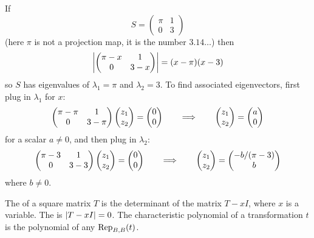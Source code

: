 \begin{example} \label{ex:AnotherCharPoly}
If
\begin{equation*}
  S=
  \begin{pmatrix}
    \pi      &1      \\
    0        &3
  \end{pmatrix}
\end{equation*}
(here \( \pi \) is not a projection map, it is the number
\( 3.14\ldots \)) then
\begin{equation*}
  \deter{
    \begin{pmatrix}
      \pi-x &1         \\
      0     &3-x
    \end{pmatrix} }
  =
  (x-\pi)(x-3)
\end{equation*}
so \( S \) has eigenvalues of \( \lambda_1=\pi \) and \( \lambda_2=3 \).
To find associated eigenvectors, first plug in $\lambda_1$ for $x$:
\begin{equation*}
  \begin{pmatrix}
    \pi-\pi     &1         \\
    0           &3-\pi
  \end{pmatrix}
  \colvec{z_1 \\ z_2}
  =
  \colvec{0 \\ 0}
  \qquad\Longrightarrow\qquad
  \colvec{z_1 \\ z_2}
  =
  \colvec{a \\ 0}
\end{equation*}
for a scalar \( a\neq 0 \),
and then plug in $\lambda_2$:
\begin{equation*}
  \begin{pmatrix}
    \pi-3       &1         \\
    0           &3-3
  \end{pmatrix}
  \colvec{z_1 \\ z_2}
  =
  \colvec{0 \\ 0}
  \qquad\Longrightarrow\qquad
  \colvec{z_1 \\ z_2}
  =
  \colvec{-b/(\pi-3) \\ b}
\end{equation*}
where \( b\neq 0 \).
\end{example}

\begin{definition}
The %
of a square matrix \( T \) is the
determinant of the matrix \( T-x I \), where \( x \) is a variable.
The %
is $\deter{T-xI}=0$.
The characteristic polynomial of a transformation \( t \) is the polynomial
of any \( \rep{t}{B,B} \).
\end{definition}

